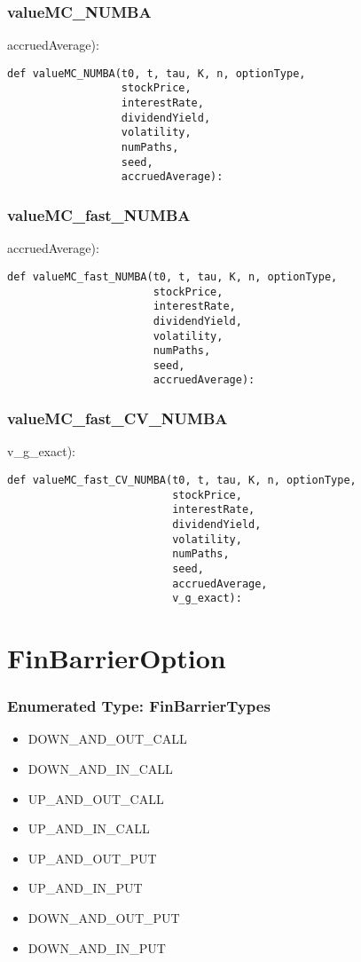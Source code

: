 \documentclass[twoside,11pt]{book}
\begin{document}
\subsubsection*{{\bf valueMC\_NUMBA}}
accruedAverage): 

\begin{lstlisting}
def valueMC_NUMBA(t0, t, tau, K, n, optionType,
                  stockPrice,
                  interestRate,
                  dividendYield,
                  volatility,
                  numPaths,
                  seed,
                  accruedAverage):
\end{lstlisting}

\subsubsection*{{\bf valueMC\_fast\_NUMBA}}
accruedAverage): 

\begin{lstlisting}
def valueMC_fast_NUMBA(t0, t, tau, K, n, optionType,
                       stockPrice,
                       interestRate,
                       dividendYield,
                       volatility,
                       numPaths,
                       seed,
                       accruedAverage):
\end{lstlisting}

\subsubsection*{{\bf valueMC\_fast\_CV\_NUMBA}}
v\_g\_exact): 

\begin{lstlisting}
def valueMC_fast_CV_NUMBA(t0, t, tau, K, n, optionType,
                          stockPrice,
                          interestRate,
                          dividendYield,
                          volatility,
                          numPaths,
                          seed,
                          accruedAverage,
                          v_g_exact):
\end{lstlisting}

\newpage
\section{FinBarrierOption}

\subsubsection{Enumerated Type: FinBarrierTypes}
\begin{itemize}
\item{DOWN\_AND\_OUT\_CALL}
\item{DOWN\_AND\_IN\_CALL}
\item{UP\_AND\_OUT\_CALL}
\item{UP\_AND\_IN\_CALL}
\item{UP\_AND\_OUT\_PUT}
\item{UP\_AND\_IN\_PUT}
\item{DOWN\_AND\_OUT\_PUT}
\item{DOWN\_AND\_IN\_PUT}
\end{itemize}
\end{document}
